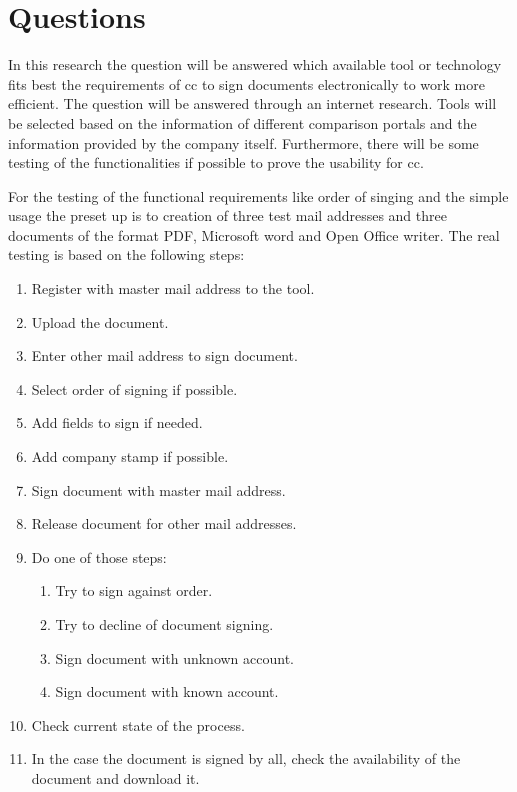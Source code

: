 \section{Questions}

In this research the question will be answered which available tool or technology fits best the requirements of \gls{cc} to sign documents electronically to work more efficient. The  question will be answered through an internet research. Tools will be selected based on the information of different comparison portals and the information provided by the company itself. Furthermore, there will be some testing of the functionalities if possible to prove the usability for \gls{cc}. 

For the testing of the functional requirements like order of singing and the simple usage the preset up is to creation of three test mail addresses and three documents of the format \gls{PDF}, Microsoft word and Open Office writer. The real testing is based on the following steps:
\begin{enumerate}
	\item Register with master mail address to the tool.
	\item Upload the document.
	\item Enter other mail address to sign document.
	\item Select order of signing if possible.
	\item Add fields to sign if needed.
	\item Add company stamp if possible.
	\item Sign document with master mail address.
	\item Release document for other mail addresses.
	\item Do one of those steps:
	\begin{enumerate}
		\item Try to sign against order.
		\item Try to decline of document signing.
		\item Sign document with unknown account.
		\item Sign document with known account. 
	\end{enumerate}
	\item Check current state of the process.
	\item In the case the document is signed by all, check the availability of the document and download it.
\end{enumerate}